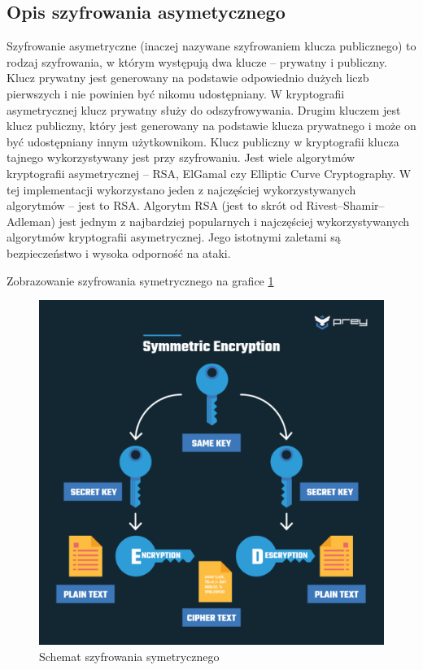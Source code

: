 \subsection{Opis szyfrowania asymetycznego}
Szyfrowanie asymetryczne (inaczej nazywane szyfrowaniem klucza publicznego) to rodzaj szyfrowania, w którym występują dwa klucze – prywatny i publiczny. Klucz prywatny jest generowany na podstawie odpowiednio dużych liczb pierwszych i nie powinien być nikomu udostępniany. W kryptografii asymetrycznej klucz prywatny służy do odszyfrowywania. Drugim kluczem jest klucz publiczny, który jest generowany na podstawie klucza prywatnego i może on być udostępniany innym użytkownikom. Klucz publiczny w kryptografii klucza tajnego wykorzystywany jest przy szyfrowaniu. Jest wiele algorytmów kryptografii asymetrycznej – RSA, ElGamal czy Elliptic Curve Cryptography. W tej implementacji wykorzystano jeden z najczęściej wykorzystywanych algorytmów – jest to RSA. Algorytm RSA (jest to skrót od Rivest–Shamir–Adleman) jest jednym z najbardziej popularnych i najczęściej wykorzystywanych algorytmów kryptografii asymetrycznej. Jego istotnymi zaletami są bezpieczeństwo i wysoka odporność na ataki.

Zobrazowanie szyfrowania symetrycznego na grafice \ref{fig:RSA1}
\begin{figure}[H]
    \centering
    \includegraphics[width=\textwidth]{Images/RSA1.png}
    \caption{Schemat szyfrowania symetrycznego}
    \label{fig:RSA1}
\end{figure}

